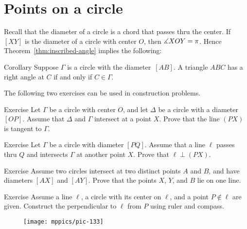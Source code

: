 \section{Points on a circle}

Recall that the diameter of a circle is a chord that passes thru the center.
If $[XY]$ is the diameter of a circle with center $O$, then $\measuredangle X O Y=\pi$. 
Hence Theorem~\ref{thm:inscribed-angle} implies the following:


\begin{thm}{Corollary}\label{cor:right-angle-diameter}
Suppose $\Gamma$ is a circle with the diameter~$[AB]$.
A triangle $ABC$ has a right angle at $C$ if and only if $C\in\Gamma$.
\end{thm}

The following two exercises can be used in construction problems.

\begin{thm}{Exercise}\label{ex:tangent-construction-inscribed}
Let $\Gamma$ be a circle with center $O$, and let $\Delta$ be a circle with a diameter $[OP]$.
Assume that $\Delta$ and $\Gamma$ intersect at a point $X$.
Prove that the line $(PX)$ is tangent to $\Gamma$.
\end{thm}

\begin{thm}{Exercise}\label{ex:perp-construction-inscribed}
Let $\Gamma$ be a circle with diameter $[PQ]$.
Assume that a line $\ell$ passes thru $Q$ and intersects $\Gamma$ at another point $X$.
Prove that $\ell \perp (PX)$.
\end{thm}



\begin{thm}{Exercise}\label{ex:altitude+circles}
Assume two circles intersect at two distinct points $A$ and $B$, and have diameters $[AX]$ and $[AY]$.
Prove that the points $X$, $Y$, and $B$ lie on one line.
\end{thm}

\begin{thm}{Exercise}\label{ex:perpendicular-ruler}
Assume a line $\ell$, 
a circle with its center on $\ell$, 
and a point $P\notin\ell$ are given.
Construct the perpendicular to $\ell$ from $P$ using ruler and compass.
\end{thm}

\begin{wrapfigure}{r}{32mm}
\vskip-4mm
\centering
\texttt{[image: mppics/pic-133]}
\end{wrapfigure}

